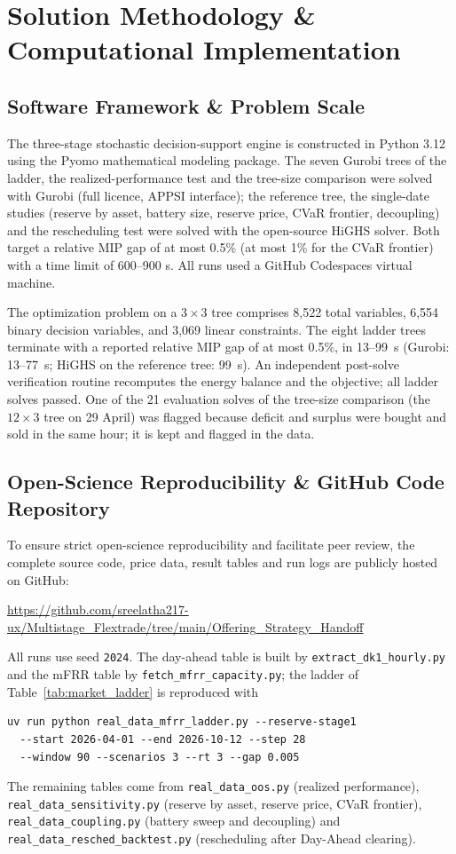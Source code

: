\documentclass[journal]{IEEEtran}
\begin{document}
\section{Solution Methodology \& Computational Implementation}

\subsection{Software Framework \& Problem Scale}
The three-stage stochastic decision-support engine is constructed in Python 3.12 using the Pyomo mathematical modeling package. The seven Gurobi trees of the ladder, the realized-performance test and the tree-size comparison were solved with Gurobi (full licence, APPSI interface); the reference tree, the single-date studies (reserve by asset, battery size, reserve price, CVaR frontier, decoupling) and the rescheduling test were solved with the open-source HiGHS solver. Both target a relative MIP gap of at most 0.5\% (at most 1\% for the CVaR frontier) with a time limit of 600--900 s. All runs used a GitHub Codespaces virtual machine.

The optimization problem on a $3\times3$ tree comprises 8,522 total variables, 6,554 binary decision variables, and 3,069 linear constraints. The eight ladder trees terminate with a reported relative MIP gap of at most 0.5\%, in 13--99~s (Gurobi: 13--77~s; HiGHS on the reference tree: 99~s). An independent post-solve verification routine recomputes the energy balance and the objective; all ladder solves passed. One of the 21 evaluation solves of the tree-size comparison (the $12\times3$ tree on 29 April) was flagged because deficit and surplus were bought and sold in the same hour; it is kept and flagged in the data.
\subsection{Open-Science Reproducibility \& GitHub Code Repository}
To ensure strict open-science reproducibility and facilitate peer review, the complete source code, price data, result tables and run logs are publicly hosted on GitHub:
\begin{center}
\footnotesize
\url{https://github.com/sreelatha217-ux/Multistage_Flextrade/tree/main/Offering_Strategy_Handoff}
\end{center}
All runs use seed \texttt{2024}. The day-ahead table is built by \texttt{extract\_dk1\_hourly.py} and the mFRR table by \texttt{fetch\_mfrr\_capacity.py}; the ladder of Table~\ref{tab:market_ladder} is reproduced with
\begin{verbatim}
uv run python real_data_mfrr_ladder.py --reserve-stage1
  --start 2026-04-01 --end 2026-10-12 --step 28
  --window 90 --scenarios 3 --rt 3 --gap 0.005
\end{verbatim}
The remaining tables come from \texttt{real\_data\_oos.py} (realized performance), \texttt{real\_data\_sensitivity.py} (reserve by asset, reserve price, CVaR frontier), \texttt{real\_data\_coupling.py} (battery sweep and decoupling) and \texttt{real\_data\_resched\_backtest.py} (rescheduling after Day-Ahead clearing).
\end{document}
